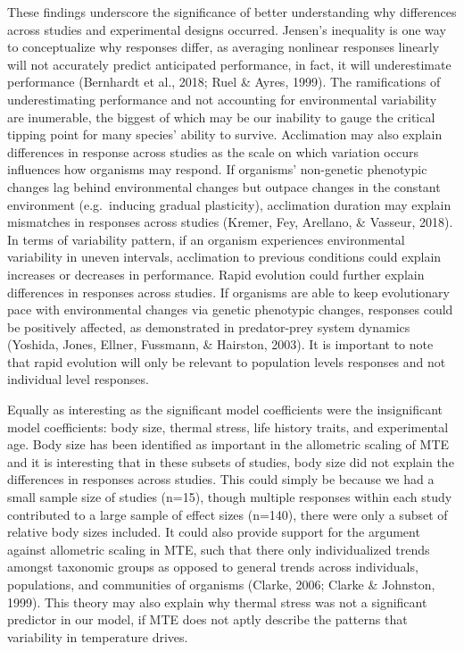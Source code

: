 \documentclass[12pt,twoside]{reedthesis}
\begin{document}
These findings underscore the significance of better understanding why differences across studies and experimental designs occurred. Jensen's inequality is one way to conceptualize why responses differ, as averaging nonlinear responses linearly will not accurately predict anticipated performance, in fact, it will underestimate performance (Bernhardt et al., 2018; Ruel \& Ayres, 1999). The ramifications of underestimating performance and not accounting for environmental variability are inumerable, the biggest of which may be our inability to gauge the critical tipping point for many species' ability to survive. Acclimation may also explain differences in response across studies as the scale on which variation occurs influences how organisms may respond. If organisms' non-genetic phenotypic changes lag behind environmental changes but outpace changes in the constant environment (e.g.~inducing gradual plasticity), acclimation duration may explain mismatches in responses across studies (Kremer, Fey, Arellano, \& Vasseur, 2018). In terms of variability pattern, if an organism experiences environmental variability in uneven intervals, acclimation to previous conditions could explain increases or decreases in performance. Rapid evolution could further explain differences in responses across studies. If organisms are able to keep evolutionary pace with environmental changes via genetic phenotypic changes, responses could be positively affected, as demonstrated in predator-prey system dynamics (Yoshida, Jones, Ellner, Fussmann, \& Hairston, 2003). It is important to note that rapid evolution will only be relevant to population levels responses and not individual level responses.

Equally as interesting as the significant model coefficients were the insignificant model coefficients: body size, thermal stress, life history traits, and experimental age. Body size has been identified as important in the allometric scaling of MTE and it is interesting that in these subsets of studies, body size did not explain the differences in responses across studies. This could simply be because we had a small sample size of studies (n=15), though multiple responses within each study contributed to a large sample of effect sizes (n=140), there were only a subset of relative body sizes included. It could also provide support for the argument against allometric scaling in MTE, such that there only individualized trends amongst taxonomic groups as opposed to general trends across individuals, populations, and communities of organisms (Clarke, 2006; Clarke \& Johnston, 1999). This theory may also explain why thermal stress was not a significant predictor in our model, if MTE does not aptly describe the patterns that variability in temperature drives.
\end{document}
